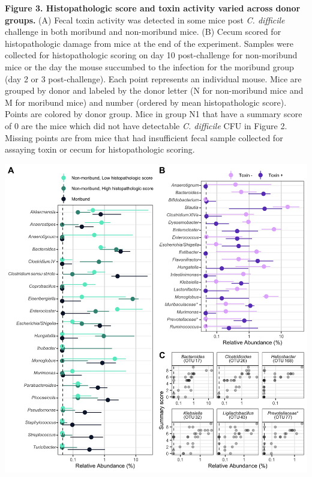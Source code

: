 \documentclass[
  12pt,
]{article}
\begin{document}
\textbf{Figure 3. Histopathologic score and toxin activity varied across
donor groups.} (A) Fecal toxin activity was detected in some mice post
\emph{C. difficile} challenge in both moribund and non-moribund mice.
(B) Cecum scored for histopathologic damage from mice at the end of the
experiment. Samples were collected for histopathologic scoring on day 10
post-challenge for non-moribund mice or the day the mouse succumbed to
the infection for the moribund group (day 2 or 3 post-challenge). Each
point represents an individual mouse. Mice are grouped by donor and
labeled by the donor letter (N for non-moribund mice and M for moribund
mice) and number (ordered by mean histopathologic score). Points are
colored by donor group. Mice in group N1 that have a summary score of 0
are the mice which did not have detectable \emph{C. difficile} CFU in
Figure 2. Missing points are from mice that had insufficient fecal
sample collected for assaying toxin or cecum for histopathologic
scoring.

\hfill\break

\includegraphics{../results/figures/figure_4.jpg}
\end{document}
